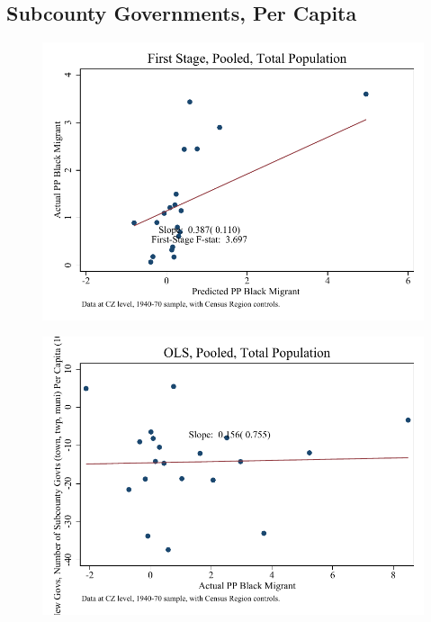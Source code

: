 \documentclass{article}
\begin{document}
\subsection{Subcounty Governments, Per Capita}

\clearpage
\begin{figure}
\centering
\includegraphics{figures/simplefigs/pooled_gen_subcounty_pc_C3_total_fs.pdf}
\end{figure}
\clearpage
\begin{figure}
\centering
\includegraphics{figures/simplefigs/pooled_gen_subcounty_pc_C3_total_ols.pdf}
\end{figure}
\clearpage
\end{document}
